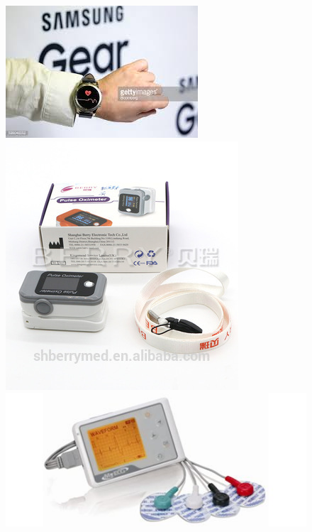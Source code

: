 \begin{figure}[H]
    \centering
	\includegraphics[scale=0.4]{images/gears3.jpg}
    \includegraphics[scale=1]{images/ppg_clip.jpg}
	\includegraphics[scale=0.3]{images/ecg_1.jpg}	

\end{figure}
